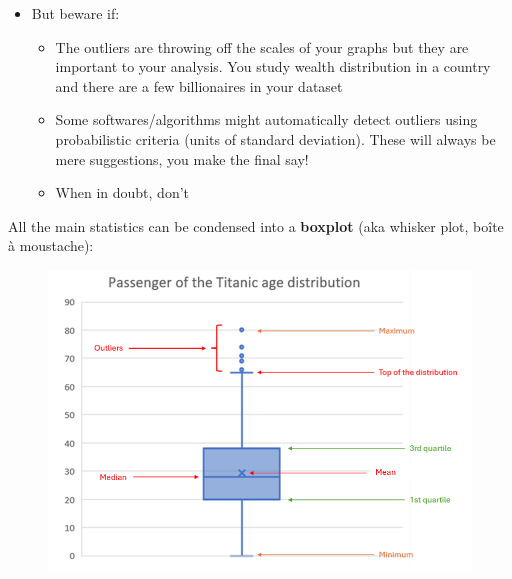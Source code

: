 \documentclass[compress]{beamer}
\begin{document}
\begin{frame}
	\begin{itemize}
		\item But beware if:
		\vspace{0.2cm}
		\begin{itemize}
			\item The outliers are throwing off the scales of your graphs but they are important to your analysis. You study wealth distribution in a country and there are a few billionaires in your dataset
			\vspace{0.2cm}
			\item Some softwares/algorithms might automatically detect outliers using probabilistic criteria (units of standard deviation). These will always be mere suggestions, you make the final say!
			\vspace{0.2cm}
			\item When in doubt, don't
		\end{itemize}
	\end{itemize}
\end{frame}

\begin{frame}
	All the main statistics can be condensed into a \textbf{boxplot} (aka whisker plot, boîte à moustache):
	\begin{figure}
		\centering
		\includegraphics[scale=0.5]{Picture/boxplot.PNG}
	\end{figure}
\end{frame}
\end{document}
